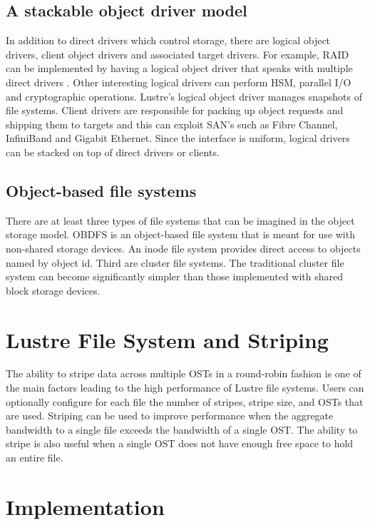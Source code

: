 \documentclass[9pt,twocolumn,twoside]{styles/osajnl}
\begin{document}
\subsection{A stackable object driver model}
In addition to direct drivers which control storage, there are logical
object drivers, client object drivers and associated target
drivers. For example, RAID can be implemented by having a logical
object driver that speaks with multiple direct drivers
\cite{www-whatislustre}. Other interesting logical drivers can perform
HSM, parallel I/O and cryptographic operations. Lustre’s logical
object driver manages snapshots of file systems. Client drivers are
responsible for packing up object requests and shipping them to
targets and this can exploit SAN's such as Fibre Channel, InfiniBand
and Gigabit Ethernet. Since the interface is uniform, logical drivers
can be stacked on top of direct drivers or clients.

\subsection{Object-based file systems}
There are at least three types of file systems that can be imagined in
the object storage model. OBDFS is an object-based file system that is
meant for use with non-shared storage devices. An inode file system
provides direct access to objects named by object id. Third are
cluster file systems. The traditional cluster file system can become
significantly simpler than those implemented with shared block storage
devices.

\section{Lustre File System and Striping}
The ability to stripe data across multiple OSTs in a round-robin
fashion is one of the main factors leading to the high performance of
Lustre file systems. Users can optionally configure for each file the
number of stripes, stripe size, and OSTs that are used. Striping can
be used to improve performance when the aggregate bandwidth to a
single file exceeds the bandwidth of a single OST. The ability to
stripe is also useful when a single OST does not have enough free
space to hold an entire file.

\section{Implementation}
\end{document}
